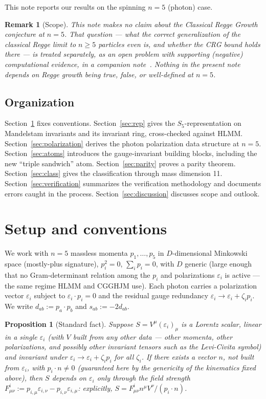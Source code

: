 \documentclass[reqno]{amsart}
\newtheorem{proposition}[theorem]{Proposition}
\newtheorem{remark}[theorem]{Remark}
\begin{document}
This note reports our results on the spinning $n=5$ (photon) case.

\begin{remark}[Scope]
This note makes \emph{no} claim about the Classical Regge Growth conjecture at $n=5$. That
question --- what the correct generalization of the classical Regge limit to $n\geq5$ particles
even is, and whether the CRG bound holds there --- is treated separately, as an open problem with
supporting (negative) computational evidence, in a companion note~\cite{crgopennote}. Nothing in
the present note depends on Regge growth being true, false, or well-defined at $n=5$.
\end{remark}

\subsection*{Organization} Section~\ref{sec:setup} fixes conventions. Section~\ref{sec:rep} gives
the $S_5$-representation on Mandelstam invariants and its invariant ring, cross-checked against
HLMM. Section~\ref{sec:polarization} derives the photon polarization data structure at $n=5$.
Section~\ref{sec:atoms} introduces the gauge-invariant building blocks, including the new
``triple sandwich'' atom. Section~\ref{sec:parity} proves a parity theorem. Section~\ref{sec:class}
gives the classification through mass dimension 11. Section~\ref{sec:verification} summarizes the
verification methodology and documents errors caught in the process. Section~\ref{sec:discussion}
discusses scope and outlook.

\section{Setup and conventions}
\label{sec:setup}

We work with $n=5$ massless momenta $p_1,\dots,p_5$ in $D$-dimensional Minkowski space
(mostly-plus signature), $p_i^2=0$, $\sum_i p_i=0$, with $D$ generic (large enough that no
Gram-determinant relation among the $p_i$ and polarizations $\varepsilon_i$ is active --- the same
regime HLMM and CGGHJM use). Each photon carries a polarization vector $\varepsilon_i$ subject to
$\varepsilon_i\cdot p_i=0$ and the residual gauge redundancy $\varepsilon_i\to\varepsilon_i+\zeta_i
p_i$. We write $d_{ab}:=p_a\cdot p_b$ and $s_{ab}:=-2d_{ab}$.

\begin{proposition}[Standard fact]
\label{prop:fieldstrength}
Suppose $S=V^\mu(\varepsilon_i)_\mu$ is a Lorentz scalar, linear in a single $\varepsilon_i$ (with
$V$ built from any other data --- other momenta, other polarizations, and possibly other invariant
tensors such as the Levi-Civita symbol) and invariant under $\varepsilon_i\to\varepsilon_i+\zeta_ip_i$
for all $\zeta_i$. If there exists a vector $n$, not built from $\varepsilon_i$, with $p_i\cdot n\neq0$
(guaranteed here by the genericity of the kinematics fixed above), then $S$ depends on
$\varepsilon_i$ only through the field strength
$F^i_{\mu\nu}:=p_{i,\mu}\varepsilon_{i,\nu}-p_{i,\nu}\varepsilon_{i,\mu}$: explicitly,
$S=F^i_{\mu\nu}n^\mu V^\nu/(p_i\cdot n)$.
\end{proposition}
\end{document}
